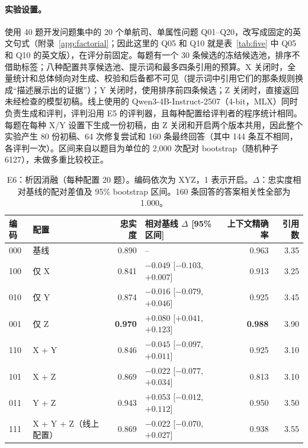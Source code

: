 \documentclass[10pt,twocolumn,a4paper]{article}
\newcommand{\best}[1]{\textbf{#1}}
\begin{document}
\paragraph{实验设置。}使用 40 题开发问题集中的 20 个单航司、单属性问题 Q01--Q20，改写成固定的英文句式（附录~\ref{app:factorial}；因此这里的 Q05 和 Q10 就是表~\ref{tab:five} 中 Q05 和 Q10 的英文版），在评分前固定。每题有一个 30 条候选的冻结候选池，排序不借助标签；八种配置共享候选池、提示词和最多四条引用的预算。X 关闭时，全量统计和总体倾向对生成、校验和后备都不可见（提示词中引用它们的那条规则换成“描述展示出的证据”）；Y 关闭时，使用排序前四条候选；Z 关闭时，直接返回未经检查的模型初稿。线上使用的 Qwen3-4B-Instruct-2507（4-bit，MLX）同时负责生成和评判，评判沿用 E5 的评判器，且每种配置给评判者的程序统计相同。每题在每种 X/Y 设置下生成一份初稿，由 Z 关闭和开启两个版本共用，因此整个实验产生 80 份初稿、64 次修复尝试和 160 条最终回答（其中 144 条互不相同，各评判一次）。区间来自以题目为单位的 2,000 次配对 bootstrap（随机种子 6127），未做多重比较校正。

\begin{table}[t]
\centering\small
\caption{E6：析因消融（每种配置 20 题）。编码依次为 XYZ，1 表示开启。$\Delta$：忠实度相对基线的配对差值及 95\% bootstrap 区间。160 条回答的答案相关性全部为 1.000。}
\label{tab:factorial}
\begin{tabular}{@{}llrlrr@{}}
\toprule
\textbf{编码} & \textbf{配置} & \textbf{忠实度} & \textbf{相对基线 $\Delta$ [95\% 区间]} & \textbf{上下文精确率} & \textbf{引用数} \\
\midrule
000 & 基线 & 0.890 & -- & 0.963 & 3.35 \\
100 & 仅 X & 0.841 & $-0.049$ [$-0.103$, $+0.007$] & 0.913 & 3.25 \\
010 & 仅 Y & 0.874 & $-0.016$ [$-0.079$, $+0.046$] & 0.925 & 3.45 \\
\rowcolor{shade} 001 & 仅 Z & \best{0.970} & $+0.080$ [$+0.041$, $+0.123$] & \best{0.988} & 3.90 \\
110 & X + Y & 0.846 & $-0.045$ [$-0.097$, $+0.011$] & 0.925 & 3.10 \\
101 & X + Z & 0.869 & $-0.022$ [$-0.077$, $+0.034$] & 0.813 & 3.10 \\
011 & Y + Z & 0.943 & $+0.053$ [$-0.012$, $+0.112$] & 0.950 & 3.50 \\
111 & X + Y + Z（线上配置） & 0.869 & $-0.022$ [$-0.070$, $+0.027$] & 0.938 & 3.55 \\
\bottomrule
\end{tabular}
\end{table}
\end{document}
